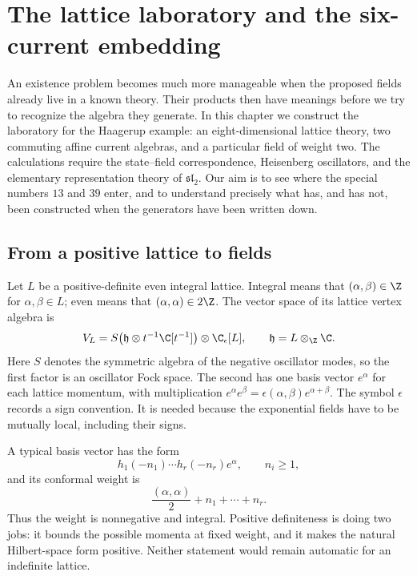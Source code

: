 \chapter{The lattice laboratory and the six-current embedding}
\label{ch:lattice_embedding}

An existence problem becomes much more manageable when the proposed fields
already live in a known theory. Their products then have meanings before we
try to recognize the algebra they generate. In this chapter we construct
the laboratory for the Haagerup example: an eight-dimensional lattice
theory, two commuting affine current algebras, and a particular field of
weight two. The calculations require the state--field correspondence,
Heisenberg oscillators, and the elementary representation theory of
$\mathfrak{sl}_2$. Our aim is to see where the special numbers $13$ and
$39$ enter, and to understand precisely what has, and has not, been
constructed when the generators have been written down.

\section{From a positive lattice to fields}

Let $L$ be a positive-definite even integral lattice. Integral means that
$(\alpha,\beta)\in\Z$ for $\alpha,\beta\in L$; even means that
$(\alpha,\alpha)\in2\Z$. The vector space of its lattice vertex algebra is
\begin{equation}\label{eq:c-lattice-space}
 V_L=S\bigl(\mathfrak h\otimes t^{-1}\C[t^{-1}]\bigr)
          \otimes\C_\epsilon[L],\qquad
 \mathfrak h=L\otimes_\Z\C.
\end{equation}
Here $S$ denotes the symmetric algebra of the negative oscillator modes,
so the first factor is an oscillator Fock space. The second has one basis
vector $e^\alpha$ for each lattice momentum, with multiplication
$e^\alpha e^\beta=\epsilon(\alpha,\beta)e^{\alpha+\beta}$.
The symbol $\epsilon$ records a sign convention. It is needed
because the exponential fields have to be mutually local, including
their signs.

A typical basis vector has the form
\[
 h_1(-n_1)\cdots h_r(-n_r)e^\alpha,
 \qquad n_i\geq1,
\]
and its conformal weight is
\begin{equation}\label{eq:c-lattice-grade}
 \frac{(\alpha,\alpha)}2+n_1+\cdots+n_r.
\end{equation}
Thus the weight is nonnegative and integral. Positive definiteness is
doing two jobs: it bounds the possible momenta at fixed weight, and it
makes the natural Hilbert-space form positive. Neither statement would
remain automatic for an indefinite lattice.

